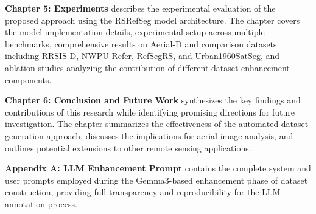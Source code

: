 \textbf{Chapter 5: Experiments} describes the experimental evaluation of the proposed approach using the RSRefSeg model architecture. The chapter covers the model implementation details, experimental setup across multiple benchmarks, comprehensive results on Aerial-D and comparison datasets including RRSIS-D, NWPU-Refer, RefSegRS, and Urban1960SatSeg, and ablation studies analyzing the contribution of different dataset enhancement components.

\textbf{Chapter 6: Conclusion and Future Work} synthesizes the key findings and contributions of this research while identifying promising directions for future investigation. The chapter summarizes the effectiveness of the automated dataset generation approach, discusses the implications for aerial image analysis, and outlines potential extensions to other remote sensing applications.

\textbf{Appendix A: LLM Enhancement Prompt} contains the complete system and user prompts employed during the Gemma3-based enhancement phase of dataset construction, providing full transparency and reproducibility for the LLM annotation process.